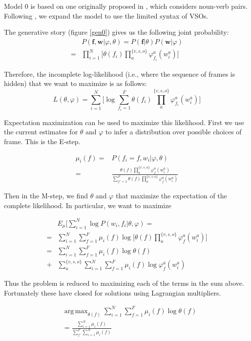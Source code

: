 \documentclass[11pt,twocolumn,DIV=11]{scrartcl}
\renewcommand\phi\varphi
\DeclareMathOperator*{\argmax}{arg\,max}
\begin{document}
Model 0 is based on one originally proposed in \citet{rooth1999}, which 
considers noun-verb pairs. Following \citet{oconnor2013}, we expand the model
to use the limited syntax of VSOs.

The generative story (figure \ref{gen0}) gives us the following joint probability:
\begin{align*}
&P(\mathbf{f},\mathbf{w}|\phi,\theta) 
  = P(\mathbf{f}|\theta)P(\mathbf{w}|\phi)\\
  =& \prod_{i=1}^{N}\big[\theta(f_i) \prod_a^{\{v,s,o\}}\phi_{f_i}^a(w_i^a)\big]
\end{align*}

Therefore, the incomplete log-likelihood (i.e., where the sequence of frames
is hidden) that we want to maximize is as follows:
\[
L(\theta,\phi) = \sum_{i=1}^N\big[\log \sum_{f_i=1}^F\theta(f_i)\prod_{a}^{\{v,s,o\}}\phi_{f_i}^a(w^a_i)\big]
\]

Expectation maximization can be used to maximize this likelihood.
First we use the current estimates for $\theta$ and $\phi$ to infer a 
distribution over possible choices of frame. This is the E-step. 

\begin{align}
\mu_i(f) =& P(f_i=f, w_i|\phi,\theta)\nonumber\\
=& \frac{\theta(f)\prod_a^{\{v,s,o\}}\phi_f^a(w^a_i)}
                {\sum_{f'=1}^F\theta(f)\prod_a^{\{v,s,o\}}\phi_f^a(w^a_i)}\label{E}
\end{align}

Then in the M-step, we find $\theta$ and $\phi$ that maximize the expectation of
the complete likelihood. In particular, we want to maximize

\begin{align*}
&E_\mu\big[\sum_{i=1}^N\log P(w_i,f_i|\theta,\phi) =\\
=& \sum_{i=1}^N\sum_{f=1}^F\mu_i(f)\log\Big[\theta(f)\prod_a^{\{v,s,o\}}\phi_f^a(w_i^a)\Big]\\
=& \sum_{i=1}^N\sum_{f=1}^F\mu_i(f)\log\theta(f)\\
+& \sum_a^{\{v,s,o\}} \sum_{i=1}^N\sum_{f=1}^F\mu_i(f)\log \phi_f^a(w_i^a)
\end{align*}

Thus the problem is reduced to maximizing each of the terms in the sum above. Fortunately
these have closed for solutions using Lagrangian multipliers.


\begin{align}
&\argmax_{\theta(f)}\sum_{i=1}^N\sum_{f=1}^F\mu_i(f)\log\theta(f)\nonumber\\
&= \frac{\sum_{i=1}^N\mu_i(f)}{\sum_{f'}^F\sum_{i=1}^N\mu_i(f)}
\end{align}
\end{document}
